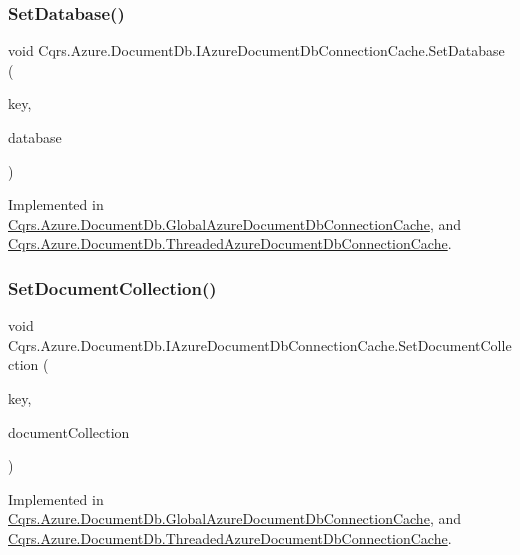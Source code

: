 \subsubsection{\texorpdfstring{Set\+Database()}{SetDatabase()}}
{\footnotesize\ttfamily void Cqrs.\+Azure.\+Document\+Db.\+I\+Azure\+Document\+Db\+Connection\+Cache.\+Set\+Database (\begin{DoxyParamCaption}\item[{string}]{key,  }\item[{Database}]{database }\end{DoxyParamCaption})}



Implemented in \hyperlink{classCqrs_1_1Azure_1_1DocumentDb_1_1GlobalAzureDocumentDbConnectionCache_a1684f60eabfa556929fc264e0192906b}{Cqrs.\+Azure.\+Document\+Db.\+Global\+Azure\+Document\+Db\+Connection\+Cache}, and \hyperlink{classCqrs_1_1Azure_1_1DocumentDb_1_1ThreadedAzureDocumentDbConnectionCache_ab3c996b8e717aec1e4fc2a70fea52d53}{Cqrs.\+Azure.\+Document\+Db.\+Threaded\+Azure\+Document\+Db\+Connection\+Cache}.

\mbox{\label{interfaceCqrs_1_1Azure_1_1DocumentDb_1_1IAzureDocumentDbConnectionCache_a6f5dab93f2ebee2503eb808b9031777d}} 
\subsubsection{\texorpdfstring{Set\+Document\+Collection()}{SetDocumentCollection()}}
{\footnotesize\ttfamily void Cqrs.\+Azure.\+Document\+Db.\+I\+Azure\+Document\+Db\+Connection\+Cache.\+Set\+Document\+Collection (\begin{DoxyParamCaption}\item[{string}]{key,  }\item[{Document\+Collection}]{document\+Collection }\end{DoxyParamCaption})}



Implemented in \hyperlink{classCqrs_1_1Azure_1_1DocumentDb_1_1GlobalAzureDocumentDbConnectionCache_a19c4bcbf0149036557fb8a3a3b687c79}{Cqrs.\+Azure.\+Document\+Db.\+Global\+Azure\+Document\+Db\+Connection\+Cache}, and \hyperlink{classCqrs_1_1Azure_1_1DocumentDb_1_1ThreadedAzureDocumentDbConnectionCache_a069d9161ed5649cc3e65cda641d5173d}{Cqrs.\+Azure.\+Document\+Db.\+Threaded\+Azure\+Document\+Db\+Connection\+Cache}.

